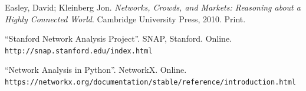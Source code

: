 \documentclass[letterpaper, 11pt]{article}
\newcommand{\1}{\mathds{1}}	%
\theoremstyle{definition}
\begin{document}


\begin{thebibliography}{2}

  Easley, David; Kleinberg Jon.
  \textit{Networks, Crowds, and Markets: Reasoning about a Highly Connected World}.
  Cambridge University Press, 2010.
  Print.

  ``Stanford Network Analysis Project''.
  SNAP, Stanford.
  Online. 
  \texttt{http://snap.stanford.edu/index.html}
  
  
  ``Network Analysis in Python''.
  NetworkX.
  Online. 
  \texttt{https://networkx.org/documentation/stable/reference/introduction.html}

\end{thebibliography}

\end{document}
